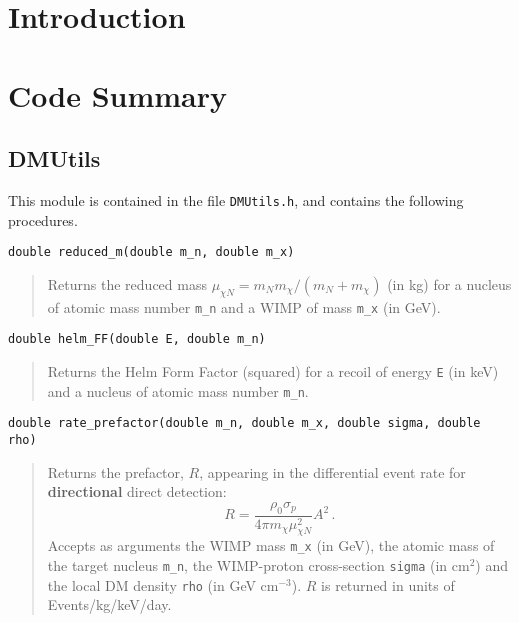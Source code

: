 \documentclass[a4paper]{article}
\begin{document}
\section{Introduction}

\section{Code Summary}

\subsection{DMUtils}

This module is contained in the file \texttt{DMUtils.h}, and contains the following procedures.

\begin{lstlisting}
double reduced_m(double m_n, double m_x)
\end{lstlisting}
\begin{quote}
Returns the reduced mass \(\mu_{\chi N} = m_N m_\chi /(m_N + m_\chi)\) (in kg) for a nucleus of atomic mass number \texttt{m\_n} and a WIMP of mass \texttt{m\_x} (in GeV).
\end{quote}

\begin{lstlisting}
double helm_FF(double E, double m_n)
\end{lstlisting}
\begin{quote}
Returns the Helm Form Factor (squared) for a recoil of energy \texttt{E} (in keV) and a nucleus of atomic mass number \texttt{m\_n}.
\end{quote}

\begin{lstlisting}
double rate_prefactor(double m_n, double m_x, double sigma, double rho)
\end{lstlisting}
\begin{quote}
Returns the prefactor, \(R\), appearing in the differential event rate for \textbf{directional} direct detection:
\begin{equation*}
R = \frac{\rho_0 \sigma_p}{4\pi m_\chi \mu^2_{\chi N}}A^2\,.
\end{equation*}
Accepts as arguments the WIMP mass \texttt{m\_x} (in GeV), the atomic mass of the target nucleus \texttt{m\_n}, the WIMP-proton cross-section \texttt{sigma} (in cm\(^{2}\)) and the local DM density \texttt{rho} (in GeV cm\(^{-3}\)). \(R\) is returned in units of Events/kg/keV/day.
\end{quote}
\end{document}
